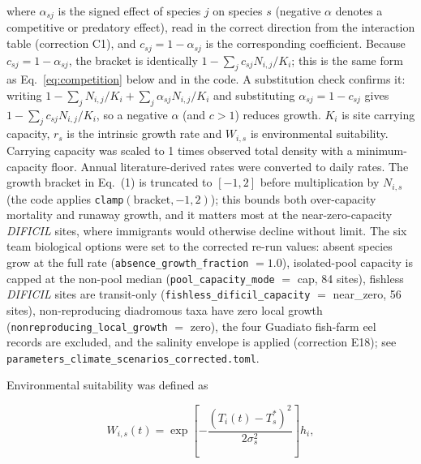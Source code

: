 \documentclass[11pt,a4paper]{article}
\begin{document}
where $\alpha_{sj}$ is the signed effect of species $j$ on species $s$ (negative $\alpha$ denotes a competitive or predatory effect), read in the correct direction from the interaction table (correction C1), and $c_{sj}=1-\alpha_{sj}$ is the corresponding coefficient. Because $c_{sj}=1-\alpha_{sj}$, the bracket is identically $1-\sum_j c_{sj}N_{i,j}/K_i$; this is the same form as Eq.~\eqref{eq:competition} below and in the code. A substitution check confirms it: writing $1-\sum_j N_{i,j}/K_i+\sum_j\alpha_{sj}N_{i,j}/K_i$ and substituting $\alpha_{sj}=1-c_{sj}$ gives $1-\sum_j c_{sj}N_{i,j}/K_i$, so a negative $\alpha$ (and $c>1$) reduces growth. $K_i$ is site carrying capacity, $r_s$ is the intrinsic growth rate and $W_{i,s}$ is environmental suitability. Carrying capacity was scaled to 1 times observed total density with a minimum-capacity floor. Annual literature-derived rates were converted to daily rates. The growth bracket in Eq.~(1) is truncated to $[-1,2]$ before multiplication by $N_{i,s}$ (the code applies \texttt{clamp}$(\text{bracket},-1,2)$); this bounds both over-capacity mortality and runaway growth, and it matters most at the near-zero-capacity \textit{DIFICIL} sites, where immigrants would otherwise decline without limit. The six team biological options were set to the corrected re-run values: absent species grow at the full rate (\texttt{absence\_growth\_fraction} $=1.0$), isolated-pool capacity is capped at the non-pool median (\texttt{pool\_capacity\_mode} $=$ cap, 84 sites), fishless \textit{DIFICIL} sites are transit-only (\texttt{fishless\_dificil\_capacity} $=$ near\_zero, 56 sites), non-reproducing diadromous taxa have zero local growth (\texttt{nonreproducing\_local\_growth} $=$ zero), the four Guadiato fish-farm eel records are excluded, and the salinity envelope is applied (correction E18); see \texttt{parameters\_climate\_scenarios\_corrected.toml}.

Environmental suitability was defined as

\begin{equation}
W_{i,s}(t) = \exp\left[-\frac{(T_i(t)-T_s^*)^2}{2\sigma_s^2}\right]h_i,
\end{equation}
\end{document}
